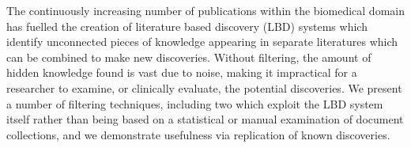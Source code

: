 The continuously increasing number of publications within the biomedical domain has fuelled the creation of literature based discovery (LBD) systems which identify unconnected pieces of knowledge appearing in separate literatures which can be combined to make new discoveries. Without filtering, the amount of hidden knowledge found is vast due to noise, making it impractical for a researcher to examine, or clinically evaluate, the potential discoveries. We present a number of filtering techniques, including two which exploit the LBD system itself rather than being based on a statistical or manual examination of document collections, and we demonstrate usefulness via replication of known discoveries.
